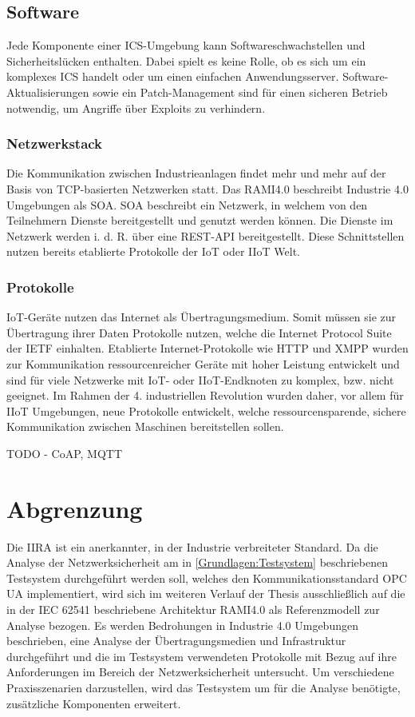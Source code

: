\subsection{Software}
Jede Komponente einer \ac{ICS}-Umgebung kann Softwareschwachstellen und Sicherheitslücken enthalten. Dabei spielt es keine Rolle, ob es sich um ein komplexes \ac{ICS} handelt oder um einen einfachen Anwendungsserver. Software-Aktualisierungen sowie ein Patch-Management sind für einen sicheren Betrieb notwendig, um Angriffe über Exploits zu verhindern. 

\subsubsection{Netzwerkstack}
Die Kommunikation zwischen Industrieanlagen findet mehr und mehr auf der Basis von TCP-basierten Netzwerken statt. Das \ac{RAMI4.0} beschreibt Industrie 4.0 Umgebungen als \ac{SOA}. \ac{SOA} beschreibt ein Netzwerk, in welchem von den Teilnehmern Dienste bereitgestellt und genutzt werden können. Die Dienste im Netzwerk werden i. d. R. über eine \ac{REST}-\ac{API} bereitgestellt. Diese Schnittstellen nutzen bereits etablierte Protokolle der \ac{IoT} oder \ac{IIoT} Welt.

\subsubsection{Protokolle}
\ac{IoT}-Geräte nutzen das Internet als Übertragungsmedium. Somit müssen sie zur Übertragung ihrer Daten Protokolle nutzen, welche die Internet Protocol Suite der \ac{IETF} einhalten. Etablierte Internet-Protokolle wie HTTP und XMPP wurden zur Kommunikation ressourcenreicher Geräte mit hoher Leistung entwickelt und sind für viele Netzwerke mit \ac{IoT}- oder \ac{IIoT}-Endknoten zu komplex, bzw. nicht geeignet. Im Rahmen der 4. industriellen Revolution wurden daher, vor allem für \ac{IIoT} Umgebungen, neue Protokolle entwickelt, welche ressourcensparende, sichere Kommunikation zwischen Maschinen bereitstellen sollen. 

TODO - CoAP, MQTT

\section{Abgrenzung}
\label{Konzept:Abgrenzung}
Die \ac{IIRA} ist ein anerkannter, in der Industrie verbreiteter Standard. Da die Analyse der Netzwerksicherheit am in \autoref{Grundlagen:Testsystem} beschriebenen Testsystem durchgeführt werden soll, welches den Kommunikationsstandard \ac{OPC UA} implementiert, wird sich im weiteren Verlauf der Thesis ausschließlich auf die in der IEC 62541 beschriebene Architektur \ac{RAMI4.0} als Referenzmodell zur Analyse bezogen. Es werden Bedrohungen in Industrie 4.0 Umgebungen beschrieben, eine Analyse der Übertragungsmedien und Infrastruktur durchgeführt und die im Testsystem verwendeten Protokolle mit Bezug auf ihre Anforderungen im Bereich der Netzwerksicherheit untersucht. Um verschiedene Praxisszenarien darzustellen, wird das Testsystem um für die Analyse benötigte, zusätzliche Komponenten erweitert. 

